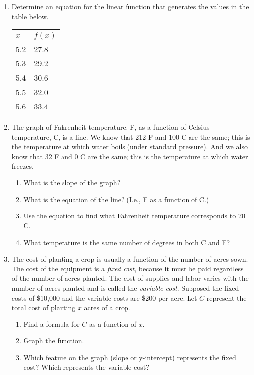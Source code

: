 \documentclass[12pt]{article}
\begin{document}
\begin{enumerate}
\setlength{\itemsep}{-1mm}
  \item Determine an equation for the linear function that generates
    the values in the table below.  

\begin{center}
\begin{tabular}{|| l | l ||}
\hline $x$ & $f(x)$ \\
\hline
5.2 & 27.8 \\
5.3 & 29.2 \\
5.4 & 30.6 \\
5.5 & 32.0 \\
5.6 & 33.4 \\
\hline
\end{tabular}
\end{center}

\item The graph of Fahrenheit temperature, F, as a function of Celsius
  temperature, C, is a line.  We know that 212 F and 100 C are the
  same; this is the temperature at which water boils (under standard
  pressure).  And we also know that 32 F and 0 C are the same; this is
  the temperature at which water freezes.
  \begin{enumerate}
  \item What is the slope of the graph?
  \item What is the equation of the line?  (I.e., F as a function of
    C.)
  \item Use the equation to find what Fahrenheit temperature
    corresponds to 20 C.
  \item What temperature is the same number of degrees in both C and
    F?
  \end{enumerate}

  \item The cost of planting a crop is usually a function of the
    number of acres sown. The cost of the equipment is a \emph{fixed
      cost}, because it must be paid regardless of the number of
    acres planted. The cost of supplies and labor varies with the
    number of acres planted and is called the \emph{variable cost}.
    Supposed the fixed costs of \$10,000 and the variable costs are
    \$200 per acre. Let $C$ represent the total cost of planting $x$
    acres of a crop.
    \begin{enumerate}
    \item Find a formula for $C$ as a function of $x$.
    \item Graph the function.
    \item Which feature on the graph (slope or y-intercept) represents
      the fixed cost?  Which represents the variable cost?
    \end{enumerate}

\end{enumerate}
\end{document}
